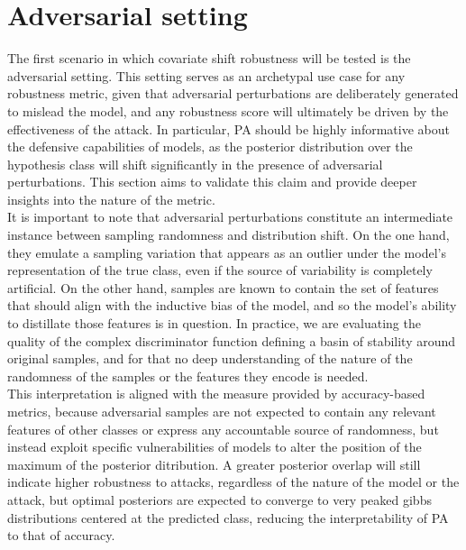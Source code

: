 \section{Adversarial setting}\label{sec:results_adversarial}

The first scenario in which covariate shift robustness will be tested is the
adversarial setting. This setting serves as an archetypal use case for any robustness 
metric, given that adversarial perturbations are deliberately generated to mislead the
model, and any robustness score will ultimately be driven by the effectiveness of the 
attack. In particular, PA should be highly informative about the defensive capabilities 
of models, as the posterior distribution over the hypothesis class will shift 
significantly in the presence of adversarial perturbations. This section aims to validate 
this claim and provide deeper insights into the nature of the metric. \\

It is important to note that adversarial perturbations constitute an
intermediate instance between sampling randomness and distribution shift. 
On the one hand, they emulate a sampling variation that appears 
as an outlier under the model's representation of the true class, even if
the source of variability is completely artificial. On the other
hand, samples are known to contain the set of features that should 
align with the inductive bias of the model, and so the model's ability to 
distillate those features is in question. In practice, we are evaluating the 
quality of the complex discriminator function defining a basin of stability
around original samples, and for that no deep understanding of the nature of 
the randomness of the samples or the features they encode is needed.\\

This interpretation is aligned with the measure provided by accuracy-based metrics, 
because adversarial samples are not expected to contain any relevant features of other
classes or express any accountable source of randomness, but instead exploit specific
vulnerabilities of models to alter the position of the maximum of 
the posterior ditribution. A greater posterior overlap will still
indicate higher robustness to attacks, regardless of the nature of the model or the
attack, but optimal posteriors are expected to converge to very peaked gibbs
distributions centered at the predicted class, reducing the interpretability of PA
to that of accuracy. \\

